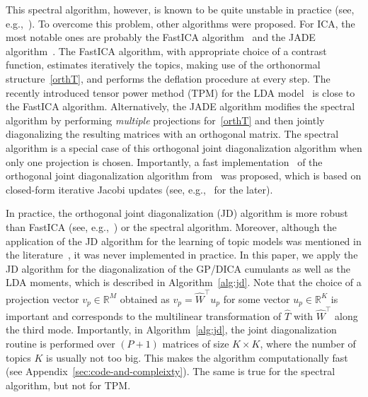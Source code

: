 \documentclass{article}
\newcommand{\wh}[1]{\widehat{#1}}
\newcommand{\rr}[1]{\mathbb{R}^{#1}}
\begin{document}
This spectral algorithm, however, is known to be quite unstable in practice (see, e.g.,~\cite{Car1999}).
To overcome this problem, other algorithms were proposed. For ICA, the most notable ones are probably the FastICA algorithm~\cite{Hyv1999} and the JADE algorithm~\cite{CarSou1993}. The FastICA algorithm, with appropriate choice of a contrast function, estimates iteratively the topics, making use of the orthonormal structure~\eqref{orthT}, and performs the deflation procedure at every step. The recently introduced tensor power method (TPM) for the LDA model~\cite{AnaEtAl2014} is close  to the FastICA algorithm. Alternatively, the JADE algorithm modifies the spectral algorithm by performing \emph{multiple} projections  for~\eqref{orthT} and then jointly diagonalizing the resulting matrices with an orthogonal matrix. The spectral algorithm is a special case of this orthogonal joint diagonalization algorithm when only one projection is chosen. Importantly, a fast implementation~\cite{CarSou1996} of the orthogonal joint diagonalization algorithm from~\cite{BunEtAl1993} was proposed, which is based on closed-form iterative Jacobi updates (see, e.g.,~\cite{NocWri2006} for the later).

In practice, the orthogonal joint diagonalization (JD) algorithm is more robust than FastICA (see, e.g.,~\cite[p.~30]{BacJor2002}) or the spectral algorithm. Moreover, although the application of the JD algorithm for the learning of topic models was mentioned in the literature~\cite{AnaEtAl2014,KulEtAl2015}, it was never implemented in practice. In this paper, we apply 
the JD algorithm for the diagonalization of the GP/DICA cumulants as well as the LDA moments, which is described in Algorithm~\ref{alg:jd}. Note that the choice of a projection vector $v_p\in\rr{M}$ obtained as $v_p = \wh{W}^{\top} u_p$ for some vector $u_p \in \rr{K}$ is important and corresponds to the multilinear transformation of $\wh{T}$ with $\wh{W}^{\top}$ along the third mode. Importantly, in Algorithm~\ref{alg:jd}, the joint diagonalization routine is performed over $(P+1)$ matrices of size $K\!\times\!K$, where the number of topics $K$ is usually not too big. This makes the algorithm computationally fast (see Appendix~\ref{sec:code-and-compleixty}). The same is true for the spectral algorithm, but not for TPM.
\end{document}

